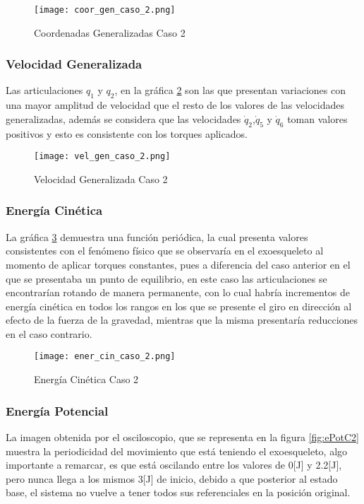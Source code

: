    \begin{figure} [H]%
            \centering
            \texttt{[image: coor\_gen\_caso\_2.png]} 
        \caption{Coordenadas Generalizadas Caso 2}
        \label{fig:CoordGenC2}
    \end{figure}

    \subsubsection{Velocidad Generalizada}
    Las articulaciones $q_1$ y $q_2$, en la gráfica \ref{fig:VelGenC2} 
    son las que presentan variaciones con una mayor amplitud de velocidad que el resto de 
    los valores de las velocidades generalizadas, 
    además se considera que las velocidades $\dot{q}_2$,$\dot{q}_5$ y 
    $\dot{q}_6$ toman valores positivos y esto es consistente con los torques aplicados.
    \begin{figure}[H]%
            \centering
            \texttt{[image: vel\_gen\_caso\_2.png]} 
        \caption{Velocidad Generalizada Caso 2}
        \label{fig:VelGenC2}
    \end{figure}

    \subsubsection{Energía Cinética}
    La gráfica \ref{fig:eCinC2} demuestra una función periódica, la cual presenta valores 
    consistentes con el fenómeno físico que se observaría en el exoesqueleto al momento de 
    aplicar torques constantes, pues a diferencia del caso anterior en el que se presentaba 
    un punto de equilibrio, en este caso las articulaciones se encontrarían rotando de manera 
    permanente, con lo cual habría incrementos de energía cinética en todos los rangos en los que 
    se presente el giro en dirección al efecto de la fuerza de la gravedad, mientras que 
    la misma presentaría reducciones en el caso contrario.

    \begin{figure} [H]%
            \centering
            \texttt{[image: ener\_cin\_caso\_2.png]} 
        \caption{Energía Cinética Caso 2}
        \label{fig:eCinC2}
    \end{figure}

    \subsubsection{Energía Potencial}
    La imagen obtenida por el osciloscopio, que se representa en la figura 
    \ref{fig:ePotC2}  muestra la periodicidad del movimiento que está teniendo 
    el exoesqueleto, algo importante a remarcar, es que está oscilando entre 
    los valores de 0[J] y 2.2[J], pero nunca llega a los mismos 3[J] de inicio, 
    debido a que posterior al estado base, el sistema no vuelve a tener todos 
    sus referenciales en la posición original. 
    
